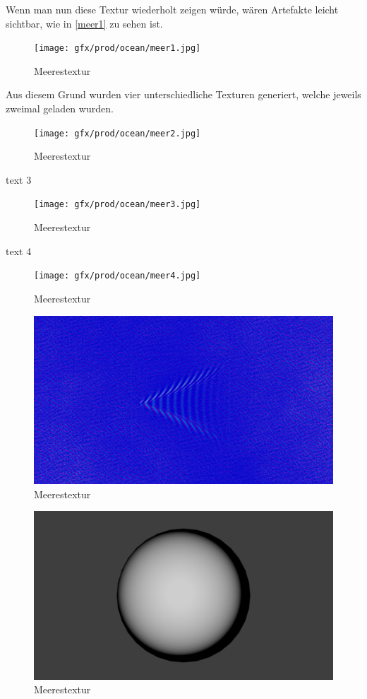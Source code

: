 Wenn man nun diese Textur wiederholt zeigen würde, wären Artefakte leicht sichtbar, wie in \autoref{meer1} zu sehen ist.

\begin{figure}[H]
\texttt{[image: gfx/prod/ocean/meer1.jpg]}
\caption{Meerestextur}
\label{meer1}
\end{figure}

Aus diesem Grund wurden vier unterschiedliche Texturen generiert, welche jeweils zweimal geladen wurden.

\begin{figure}[H]
\texttt{[image: gfx/prod/ocean/meer2.jpg]}
\caption{Meerestextur}
\label{meer2}
\end{figure}

text 3

\begin{figure}[H]
\texttt{[image: gfx/prod/ocean/meer3.jpg]}
\caption{Meerestextur}
\label{meer3}
\end{figure}

text 4

\begin{figure}[H]
\texttt{[image: gfx/prod/ocean/meer4.jpg]}
\caption{Meerestextur}
\label{meer4}
\end{figure}

\begin{figure}[H]
\includegraphics[width=\textwidth]{gfx/prod/ocean/meer5.jpg}
\caption{Meerestextur}
\label{meer5}
\end{figure}

\begin{figure}[H]
\includegraphics[width=\textwidth]{gfx/prod/ocean/meer6.jpg}
\caption{Meerestextur}
\label{meer6}
\end{figure}


